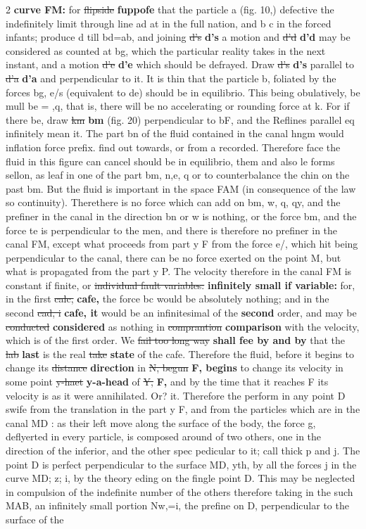 \documentclass[10pt]{article}
\begin{document}
\begin{multicols}{2}
\textbf{curve FM:} for \sout{flipside} \textbf{fuppofe} that the particle a (fig. 10,) defective the indefinitely limit through line ad at in the full nation, and b c in the forced infants; produce d till bd=ab, and joining \sout{d’s} \textbf{d's} a motion and \sout{d’d} \textbf{d'd} may be considered as counted at bg, which the particular reality takes in the next instant, and a motion \sout{d’e} \textbf{d'e} which should be defrayed. Draw \sout{d’s} \textbf{d's} parallel to \sout{d’a} \textbf{d'a} and perpendicular to it. It is thin that the particle b, foliated by the forces bg, e/s (equivalent to de) should be in equilibrio. This being obulatively, be mull be = ,q, that is, there will be no accelerating or rounding force at k. For if there be, draw \sout{km} \textbf{bm} (fig. 20) perpendicular to bF, and the Reflines parallel eq infinitely mean it. The part bn of the fluid contained in the canal hngm would inflation force prefix. find out towards, or from a recorded. Therefore face the fluid in this figure can cancel should be in equilibrio, them and also le forms sellon, as leaf in one of the part bm, n,e, q or to counterbalance the chin on the past bm. But the fluid is important in the space FAM (in consequence of the law so continuity). Therethere is no force which can add on bm, w, q, qy, and the prefiner in the canal in the direction bn or w is nothing, or the force bm, and the force te is perpendicular to the men, and there is therefore no prefiner in the canal FM, except what proceeds from part y F from the force e/, which hit being perpendicular to the canal, there can be no force exerted on the point M, but what is propagated from the part y P. The velocity therefore in the canal FM is constant if finite, or \sout{individual fault variables:} \textbf{infinitely small if variable:} for, in the first \sout{calc,} \textbf{cafe,} the force bc would be absolutely nothing; and in the second \sout{cad, i} \textbf{cafe, it} would be an infinitesimal of the \textbf{second} order, and may be \sout{conducted} \textbf{considered} as nothing in \sout{comprantion} \textbf{comparison} with the velocity, which is of the first order. We \sout{fail too long way} \textbf{shall fee by and by} that the \sout{lab} \textbf{last} is the real \sout{take} \textbf{state} of the cafe. Therefore the fluid, before it begins to change its \sout{distance} \textbf{direction} in \sout{N, begun} \textbf{F, begins} to change its velocity in some point \sout{y-haet} \textbf{y-a-head} of \sout{Y,} \textbf{F,} and by the time that it reaches F its velocity is as it were annihilated. Or? it. Therefore the perform in any point D swife from the translation in the part y F, and from the particles which are in the canal MD : as their left move along the surface of the body, the force g, deflyerted in every particle, is composed around of two others, one in the direction of the inferior, and the other spec pedicular to it; call thick p and j. The point D is perfect perpendicular to the surface MD, yth, by all the forces j in the curve MD; z; i, by the theory eding on the fingle point D. This may be neglected in compulsion of the indefinite number of the others therefore taking in the such MAB, an infinitely small portion Nw,=i, the prefine on D, perpendicular to the surface of the 
\end{multicols}
\end{document}
